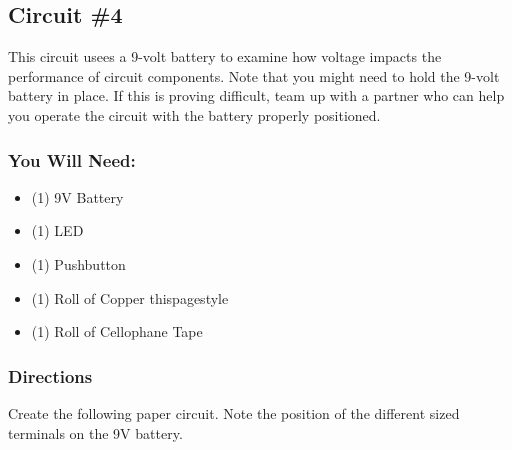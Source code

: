     \subsection{Circuit \#4}
    This circuit usees a 9-volt battery to examine how voltage impacts the performance of circuit components. Note that you might need to hold the 9-volt battery in place. If this is proving difficult, team up with a partner who can help you operate the circuit with the battery properly positioned.

    \subsubsection*{You Will Need:}
    \begin{itemize}[noitemsep]\small
        \item (1) 9V Battery
        \item (1) LED
        \item (1) Pushbutton
        \item (1) Roll of Copper thispagestyle
        \item (1) Roll of Cellophane Tape
    \end{itemize}

    \subsubsection*{Directions}
    Create the following paper circuit. Note the position of the different sized terminals on the 9V battery.

